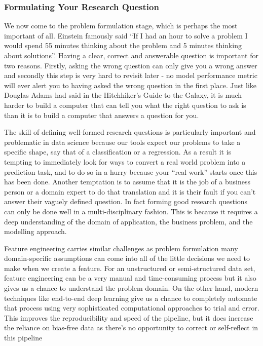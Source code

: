 \documentclass[
]{book}
\theoremstyle{definition}
\theoremstyle{definition}
\theoremstyle{definition}
\theoremstyle{definition}
\theoremstyle{remark}
\begin{document}
\hypertarget{formulating-your-research-question}{%
\subsubsection{Formulating Your Research Question}\label{formulating-your-research-question}}

We now come to the problem formulation stage, which is perhaps the most important of all. Einstein famously said ``If I had an hour to solve a problem I would spend 55 minutes thinking about the problem and 5 minutes thinking about solutions''. Having a clear, correct and answerable question is important for two reasons. Firstly, asking the wrong question can only give you a wrong answer and secondly this step is very hard to revisit later - no model performance metric will ever alert you to having asked the wrong question in the first place. Just like Douglas Adams had said in the Hitchhiker's Guide to the Galaxy, it is much harder to build a computer that can tell you what the right question to ask is than it is to build a computer that answers a question for you.

The skill of defining well-formed research questions is particularly important and problematic in data science because our tools expect our problems to take a specific shape, say that of a classification or a regression. As a result it is tempting to immediately look for ways to convert a real world problem into a prediction task, and to do so in a hurry because your ``real work'' starts once this has been done. Another temptation is to assume that it is the job of a business person or a domain expert to do that translation and it is their fault if you can't answer their vaguely defined question.
In fact forming good research questions can only be done well in a multi-disciplinary fashion. This is because it requires a deep understanding of the domain of application, the business problem, and the modelling approach.

Feature engineering carries similar challenges as problem formulation many domain-specific assumptions can come into all of the little decisions we need to make when we create a feature. For an unstructured or semi-structured data set, feature engineering can be a very manual and time-consuming process but it also gives us a chance to understand the problem domain. On the other hand, modern techniques like end-to-end deep learning give us a chance to completely automate that process using very sophisticated computational approaches to trial and error. This improves the reproducibility and speed of the pipeline, but it does increase the reliance on bias-free data as there's no opportunity to correct or self-reflect in this pipeline
\end{document}
